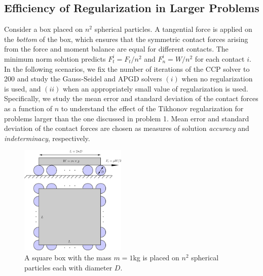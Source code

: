 \begin{itemize}
\end{itemize}



\subsection{Efficiency of Regularization in Larger Problems}
Consider a box placed on $n^2$ spherical particles. A tangential force is applied on the \textit{bottom} of the box, which ensures that the symmetric contact forces arising from the force and moment balance are equal for different contacts. The minimum norm  solution predicts $F^i_t=F_t/n^2$ and $F^i_n=W/n^2$ for each contact $i$. In the following scenarios, we fix the number of iterations of the CCP solver to 200 and study the Gauss-Seidel and APGD solvers  $(i)$ when no regularization is used, and $(ii)$ when an appropriately small value of regularization is used. Specifically, we study the mean error and standard deviation of the contact forces as a function of $n$ to understand the effect of the Tikhonov regularization for problems larger than the one discussed in problem 1. Mean error and standard deviation of the contact forces are chosen as measures of solution \textit{accuracy} and \textit{indeterminacy}, respectively.
\begin{figure}[H]
	\begin{center}
		\includegraphics[width=0.45\textwidth]{images/CD/Box_Spheres.png}
	\end{center}
	\caption{A square box with the mass $m=1$\si{kg} is placed on $n^2$ spherical particles each with diameter $D$. }
\end{figure}
